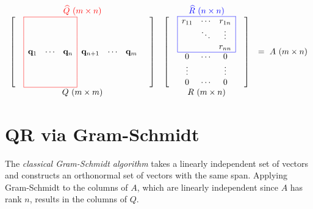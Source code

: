 \begin{align*} %
\begin{array}{ccc}
\textcolor{red}{\widehat{Q}\ (m \times n)} & \textcolor{blue}{\widehat{R}\ (n \times n)} & \\
\left[\begin{array}{cccccccc}
\arrayrulecolor{red}
\cline{2-4}
& \lvl{}     &        & \rvl{}     &          &        &      & \\
& \lvl{}     &        & \rvl{}     &          &        &      & \\
& \lvl{}     &        & \rvl{}     &          &        &      & \\
& \lvl{\q_1} & \cdots & \rvl{\q_n} & \q_{n+1} & \cdots & \q_m & \\
& \lvl{}     &        & \rvl{}     &          &        &      & \\
& \lvl{}     &        & \rvl{}     &          &        &      & \\
& \lvl{}     &        & \rvl{}     &          &        &      & \\
\cline{2-4}
\end{array}\right]
&
\left[\begin{array}{ccccc}
\arrayrulecolor{blue}
\cline{2-4}
& \lvl{r_{11}} & \cdots & \rvl{r_{1n}} & \\
& \lvl{}       & \ddots & \rvl{\vdots} & \\
& \lvl{}       &        & \rvl{r_{nn}} & \\
\cline{2-4}
& 0            & \cdots & 0            & \\
& \vdots       &        & \vdots       & \\
& 0            & \cdots & 0            & \\
\end{array}\right]
& =\ A\ (m \times n)
\\
Q\ (m \times m) & R\ (m \times n) & \\
\end{array}
\end{align*}

\section*{QR via Gram-Schmidt} %

The \emph{classical Gram-Schmidt algorithm} takes a linearly independent set of vectors and constructs an orthonormal set of vectors with the same span.
Applying Gram-Schmidt to the columns of $A$, which are linearly independent since $A$ has rank $n$, results in the columns of $Q$.

